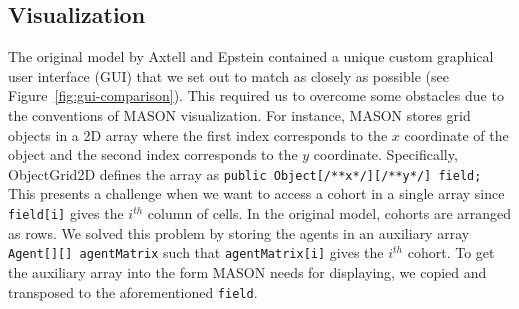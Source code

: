 \documentclass[runningheads,a4paper]{article}
\begin{document}
\subsection{Visualization}

The original model by Axtell and Epstein contained a unique custom graphical user interface (GUI) that we set out to match as closely as possible (see Figure~\ref{fig:gui-comparison}).
This required us to overcome some obstacles due to the conventions of MASON visualization. 
For instance, MASON stores grid objects in a 2D array where the first index corresponds to the $x$ coordinate of the object and the second index corresponds to the $y$ coordinate. 
Specifically, ObjectGrid2D defines the array as \lstinline!public Object[/**x*/][/**y*/] field;! 
This presents a challenge when we want to access a cohort in a single array since \lstinline!field[i]! gives the $i^{th}$ column of cells. In the original model, cohorts are arranged as rows. 
We solved this problem by storing the agents in an auxiliary array \lstinline!Agent[][] agentMatrix! such that \lstinline!agentMatrix[i]! gives the $i^{th}$ cohort.
To get the auxiliary array into the form MASON needs for displaying, we copied and transposed to the aforementioned \lstinline!field!.
\end{document}
